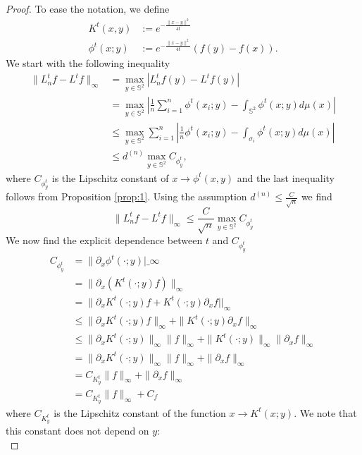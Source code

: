 \documentclass{article} %
\renewcommand{\S}{\mathbb{S}}
\begin{document}
\begin{proof}
To ease the notation, we define
\begin{align}
	K^t(x,y) &:=  e^{-\frac{\|x-y\|^2}{4t}}\\
	\phi^t(x;y) &:= e^{-\frac{\|x-y\|^2}{4t}}\left(f(y)-f(x)\right).
\end{align}
We start with the following inequality
\begin{align}
	\|L_n^tf-L^tf\|_\infty &= \max _{y\in \S^2} \left|L_n^tf(y)-L^tf(y)\right| \nonumber\\
	&= \max _{y\in \S^2} \left| \frac{1}{n} \sum_{i=1}^n \phi^t(x_i; y)- \int_{\S^2} \phi^t(x;y)d\mu(x) \right| \nonumber\\
	&\leq \max _{y\in \S^2}  \sum_{i=1}^n   \left| \frac{1}{n}  \phi^t(x_i; y)- \int_{\sigma_i} \phi^t(x;y)d\mu(x) \right| \nonumber\\
	&\leq  d^{(n)} \max _{y\in \S^2} C_{\phi^t_y} , \label{eq:prop3-base-ineq}
\end{align}
where $C_{\phi^t_y}$ is the Lipschitz constant of $x \rightarrow \phi^t(x, y)$ and the last inequality follows from Proposition \ref{prop:1}. 
Using the assumption $d^{(n)}\leq \frac{C}{\sqrt{n}}$ we find
\begin{equation*}
\|L_n^tf-L^tf\|_\infty  \leq  \frac{C}{\sqrt{n}} \max _{y\in \S^2}  C_{\phi^t_y}  
\end{equation*}
We now find the explicit dependence between $t$ and $C_{\phi^t_y}$
\begin{align*}
	C_{\phi^t_y} &= \|\partial_x\phi^t(\cdot;y)|\_\infty\\&
	= \|\partial_x\left(K^t(\cdot;y)f\right)\|_\infty\\&
	= \|\partial_x K^t(\cdot;y)f + K^t(\cdot;y)\partial_x f||_\infty\\&
	\leq \|\partial_x K^t(\cdot;y)f\|_\infty + \|K^t(\cdot;y)\partial_x f\|_\infty\\&
	\leq  \|\partial_x K^t(\cdot;y)\|_\infty\|f\|_\infty + \|K^t(\cdot;y)\|_\infty\|\partial_x f\|_\infty\\&
	= \|\partial_x K^t(\cdot;y)\|_\infty\|f\|_\infty + \|\partial_x f\|_\infty\\&
	= C_{K^t_y} \|f\|_\infty + \|\partial_xf\|_\infty\\&
	= C_{K^t_y} \|f\|_\infty + C_f
\end{align*}
where $C_{K^t_y}$ is the Lipschitz constant of the function $x\rightarrow K^t(x;y)$. We note that this constant does not depend on $y$:
\begin{equation*}

\end{equation*}
\end{proof}
\end{document}
